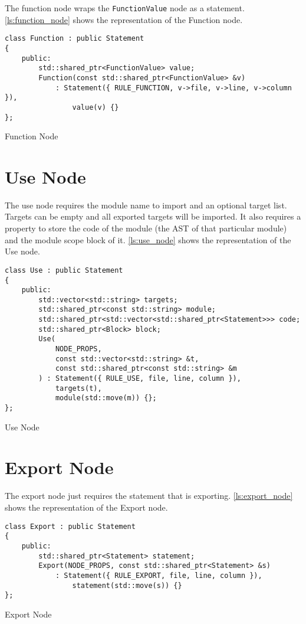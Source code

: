 The function node wraps the \texttt{FunctionValue} node as a statement.
\autoref{ls:function_node} shows the representation of the Function node.

\begin{listing}[H]
\begin{verbatim}
class Function : public Statement
{
    public:
        std::shared_ptr<FunctionValue> value;
        Function(const std::shared_ptr<FunctionValue> &v)
            : Statement({ RULE_FUNCTION, v->file, v->line, v->column }),
                value(v) {}
};
\end{verbatim}
\caption{Function Node}
\label{ls:function_node}
\end{listing}

\section{Use Node}

The use node requires the module name to import and an optional target list. Targets can be empty and all exported targets
will be imported. It also requires a property to store the code of the module (the AST of that particular module) and
the module scope block of it.
\autoref{ls:use_node} shows the representation of the Use node.

\begin{listing}[H]
\begin{verbatim}
class Use : public Statement
{
    public:
        std::vector<std::string> targets;
        std::shared_ptr<const std::string> module;
        std::shared_ptr<std::vector<std::shared_ptr<Statement>>> code;
        std::shared_ptr<Block> block;
        Use(
            NODE_PROPS,
            const std::vector<std::string> &t,
            const std::shared_ptr<const std::string> &m
        ) : Statement({ RULE_USE, file, line, column }),
            targets(t),
            module(std::move(m)) {};
};
\end{verbatim}
\caption{Use Node}
\label{ls:use_node}
\end{listing}

\section{Export Node}

The export node just requires the statement that is exporting.
\autoref{ls:export_node} shows the representation of the Export node.

\begin{listing}[H]
\begin{verbatim}
class Export : public Statement
{
    public:
        std::shared_ptr<Statement> statement;
        Export(NODE_PROPS, const std::shared_ptr<Statement> &s)
            : Statement({ RULE_EXPORT, file, line, column }),
                statement(std::move(s)) {}
};
\end{verbatim}
\caption{Export Node}
\label{ls:export_node}
\end{listing}

